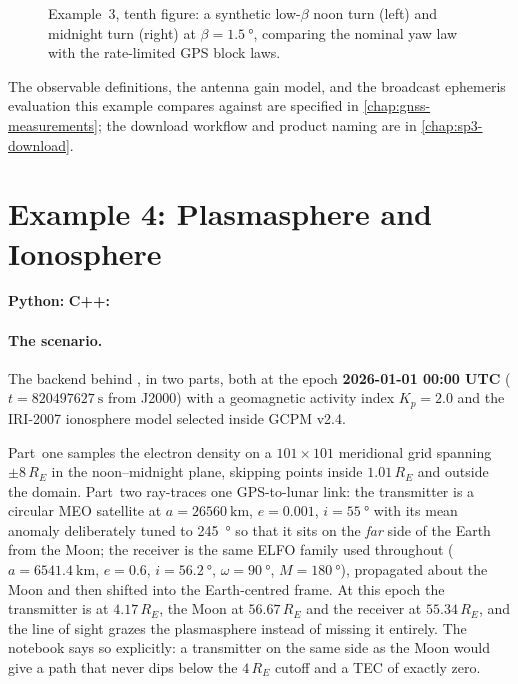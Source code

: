 \begin{figure}[htbp]
  \centering
  \caption{Example~3, tenth figure: a synthetic low-$\beta$ noon turn (left) and
           midnight turn (right) at $\beta=\SI{1.5}{\degree}$, comparing the
           nominal yaw law with the rate-limited GPS block laws.}
  \label{fig:tut-ex3-yaw}
\end{figure}

The observable definitions, the antenna gain model, and the broadcast ephemeris
evaluation this example compares against are specified in
\cref{chap:gnss-measurements}; the download workflow and product naming are in
\cref{chap:sp3-download}.

\section{Example 4: Plasmasphere and Ionosphere}
\label{sec:tut-ex4}

\textbf{Python:}  \quad
\textbf{C++:} 

\paragraph{The scenario.}
The  backend behind , in two parts, both at the
epoch \textbf{2026-01-01 00:00 UTC} ($t=\SI{820497627}{\second}$ from J2000)
with a geomagnetic activity index $K_p = 2.0$ and the IRI-2007 ionosphere model
selected inside GCPM v2.4.

Part~one samples the electron density on a $101\times101$ meridional grid
spanning $\pm 8\,R_E$ in the noon--midnight plane, skipping points inside
$1.01\,R_E$ and outside the domain. Part~two ray-traces one GPS-to-lunar link:
the transmitter is a circular MEO satellite at
$a=\SI{26560}{\kilo\meter}$, $e=0.001$, $i=\SI{55}{\degree}$ with its mean
anomaly deliberately tuned to \SI{245}{\degree} so that it sits on the
\emph{far} side of the Earth from the Moon; the receiver is the same ELFO family
used throughout ($a=\SI{6541.4}{\kilo\meter}$, $e=0.6$, $i=\SI{56.2}{\degree}$,
$\omega=\SI{90}{\degree}$, $M=\SI{180}{\degree}$), propagated about the Moon and
then shifted into the Earth-centred frame. At this epoch the transmitter is at
$4.17\,R_E$, the Moon at $56.67\,R_E$ and the receiver at $55.34\,R_E$, and the
line of sight grazes the plasmasphere instead of missing it entirely. The
notebook says so explicitly: a transmitter on the same side as the Moon would
give a path that never dips below the $4\,R_E$ cutoff and a TEC of exactly zero.

